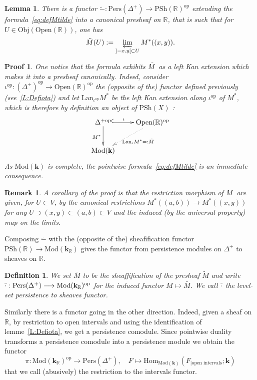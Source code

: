 \documentclass[a4paper, english, 11pt]{article}
\newcommand{\kk}[0]{\textbf{k}}
\newcommand{\Mod}[0]{\text{Mod}}
\newcommand{\Pe}{\text{Pers}}
\newcommand{\0}{\vec{0}}
\newcommand{\R}[0]{\mathbb{R}}
\newcommand{\Obj}[0]{\text{Obj}}
\newcommand{\Ouv}[0]{\mathrm{Open}}
\newcommand{\op}[0]{\text{op}}
\newcommand{\Hom}[0]{\text{Hom}}
\newtheorem*{pf}{Proof} }
\newtheorem{remark}[prop]{Remark}
\newtheorem{lem}[prop]{Lemma}
\newtheorem{defi}[prop]{Definition}
\begin{document}
\begin{lem} There is a functor $\tilde{-}: \Pe(\Delta^+)\to \text{PSh}(\R)^{\op}$   extending the formula~\eqref{eq:defMtilde} into a canonical presheaf on $\R$, that is such that for   $U \in \Obj(\Ouv(\R))$, one has $$\Tilde{M} (U):=  \varprojlim_{]-x,y[\subset U} M^*((x,y)).$$ 
\end{lem}
\begin{pf} One notice that the formula exhibits  $\Tilde{M}$ as a  left Kan extension which makes it into a presheaf canonically. Indeed, 
 consider $\iota^\text{op} : (\Delta^{+})^{\op}\longrightarrow \Ouv(\R)^{\op}$ the (opposite of the) functor defined previously (see~\ref{L:Defiota}) and let  $\text{Lan}_{\iota^\text{op}} M^*$  be the left Kan extension along $\iota^\text{op}$ of $M^*$, which is therefore by definition an object of $\text{PSh}(X)$ : 
$$\xymatrix{ \Delta^{+\text{op}}
\ar@{^{(}->}[r]^-{\iota} \ar[d]_{M^*} & \Ouv(\R)^\text{op} \ar@{.>}[dl]^{\text{Lan}_\iota M^* =: \Tilde{M}} \\
\Mod(\kk) & } $$
As $\Mod(\kk)$ is complete,  the pointwise formula~\eqref{eq:defMtilde} is an immediate consequence.  
\end{pf}
\begin{remark}
 A corollary of the proof is that the restriction morphism of $\Tilde{M}$ are given, for $U\subset V$, by the canonical restrictions $M^*((a,b)) \to M^*((x,y))$ for any $ U\supset (x,y) \subset (a,b)\subset V$ and the induced (by the universal property) map on the limits. 
\end{remark}
Composing $\tilde{-}$ with the (opposite of the) sheafification functor $ \text{PSh}(\R) \to \Mod(\kk_{\R})$ gives the functor from persistence modules on $\Delta^{+}$ to sheaves on $\R$. 
\begin{defi}\label{D:defofBar}
We set $\bar{M}$ to be the sheaffification of the presheaf $\tilde{M}$ and write 
$\Bar{\cdot} : \Pe(\Delta^+)\longrightarrow \Mod (\kk_\R)^{\op}$ for the induced functor $M\mapsto \bar{M}$. We call $\Bar{\cdot}$ the level-set persistence to sheaves functor. 
\end{defi}
Similarly there is a functor going in the other direction. Indeed, given a sheaf on $\R$, by restriction to open intervals and using the identification of lemme~\ref{L:Defiota}, we get a persistence comodule. Since pointwise duality transforms a persistence comodule into a persistence module we obtain the functor 
\begin{equation}
 \label{eq:defpi}  \pi : \Mod(\kk_\R)^{\op} \longrightarrow \Pe(\Delta^+), \quad F\mapsto \Hom_{\Mod(\kk)}(F_{ | \text{open intervals}};\kk)
\end{equation}
that we call (abusively) the restriction to the intervals functor.
\end{document}
